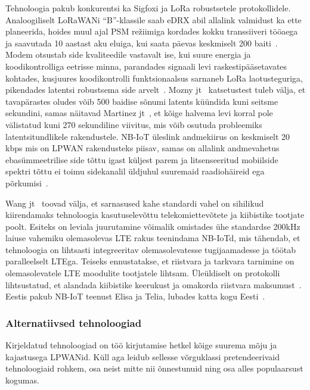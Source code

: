 \documentclass[12pt]{article}
\begin{document}
    Tehnoloogia pakub konkurentsi ka Sigfoxi ja LoRa robustsetele protokollidele.
    Analoogiliselt LoRaWANi “B”-klassile saab eDRX abil allalink valmidust ka ette planeerida, hoides muul ajal PSM režiimiga kordades kokku transsiiveri tööaega ja saavutada 10 aastast aku eluiga, kui saata päevas keskmiselt 200 baiti~\cite{wanglin}.
    Modem otsustab side kvaliteedile vastavalt ise, kui suure energia ja koodikontrolliga eetrisse minna, parandades signaali levi raskestipääsetavates kohtades, kusjuures koodikontrolli funktsionaalsus sarnaneb LoRa laotusteguriga, pikendades latentsi robustsema side arvelt~\cite{martinez}.
    Mozny jt~\cite{mozny} katsetustest tuleb välja, et tavapärastes oludes võib 500 baidise sõnumi latents küündida kuni seitsme sekundini, samas näitavad Martinez jt~\cite{martinez}, et kõige halvema levi korral pole välistatud kuni 270 sekundiline viivitus, mis võib osutuda probleemiks latentsitundlikele rakendustele.
    NB-IoT üleslink andmekiirus on keskmiselt 20 kbps mis on LPWAN rakendusteks piisav, samas on allalink andmevahetus ebasümmeetrilise side tõttu igast küljest parem ja litsenseeritud mobiilside spektri tõttu ei toimu sidekanalil üldjuhul suuremaid raadiohäireid ega põrkumisi~\cite{wanglin}.

    Wang jt~\cite{wanglin} toovad välja, et sarnasused kahe standardi vahel on sihilikud kiirendamaks tehnoloogia kasutuselevõttu telekomiettevõtete ja kiibistike tootjate poolt.
    Esiteks on leviala juurutamine võimalik omistades ühe standardse 200kHz laiuse vahemiku olemasolevas LTE rakus teenindama NB-IoTd, mis tähendab, et tehnoloogia on lihtsasti integreeritav olemasolevatesse tugijaamadesse ja töötab paralleelselt LTEga.
    Teiseks ennustatakse, et riistvara ja tarkvara tarnimine on olemasolevatele LTE moodulite tootjatele lihtsam.
    Üleüldiselt on protokolli lihtsustatud, et alandada kiibistike keerukust ja omakorda riistvara maksumust~\cite{xuyao}.
    Eestis pakub NB-IoT teenust Elisa ja Telia, lubades katta kogu Eesti~\cite{nbtelia}.

    \subsubsection{Alternatiivsed tehnoloogiad}

    Kirjeldatud tehnoloogiad on töö kirjutamise hetkel kõige suurema mõju ja kajastusega LPWANid.
    Küll aga leidub sellesse võrguklassi pretendeerivaid tehnoloogiaid rohkem, osa neist mitte nii õnnestunuid ning osa alles populaarsust kogumas.
\end{document}
